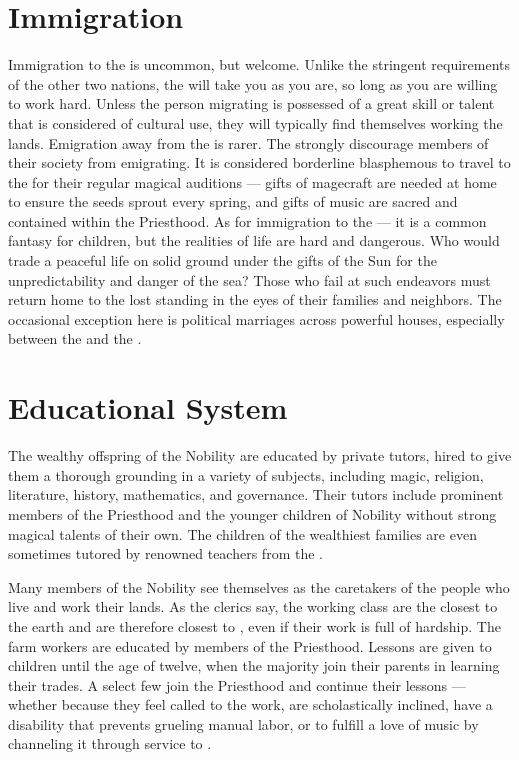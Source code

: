 \documentclass[blue]{GL2020}
\begin{document}
\section*{Immigration}
Immigration to the \pFarm{} is uncommon, but welcome. Unlike the stringent requirements of the other two nations, the \pFarm{} will take you as you are, so long as you are willing to work hard.  Unless the person migrating is possessed of a great skill or talent that is considered of cultural use, they will typically find themselves working the lands. Emigration away from the \pFarm{} is rarer. The \pFarmers{} strongly discourage members of their society from emigrating. It is considered borderline blasphemous to travel to the \pTech{} for their regular magical auditions — gifts of magecraft are needed at home to ensure the seeds sprout every spring, and gifts of music are sacred and contained within the Priesthood. As for immigration to the \pShip{} — it is a common fantasy for children, but the realities of \pShip{} life are hard and dangerous. Who would trade a peaceful life on solid ground under the gifts of the Sun for the unpredictability and danger of the sea? Those who fail at such endeavors must return home to the lost standing in the eyes of their families and neighbors. The occasional exception here is political marriages across powerful houses, especially between the \pTechies{} and the \pFarm{}.

\section*{Educational System}
The wealthy offspring of the Nobility are educated by private tutors, hired to give them a thorough grounding in a variety of subjects, including magic, religion, literature, history, mathematics, and governance. Their tutors include prominent members of the Priesthood and the younger children of Nobility without strong magical talents of their own. The children of the wealthiest families are even sometimes tutored by renowned teachers from the \pTech{}.

Many members of the Nobility see themselves as the caretakers of the people who live and work their lands. As the clerics say, the working class are the closest to the earth and are therefore closest to \cFarmGod{}, even if their work is full of hardship. The farm workers are educated by members of the Priesthood. Lessons are given to children until the age of twelve, when the majority join their parents in learning their trades. A select few join the Priesthood and continue their lessons — whether because they feel called to the work, are scholastically inclined, have a disability that prevents grueling manual labor, or to fulfill a love of music by channeling it through service to \cFarmGod{}.
\end{document}
